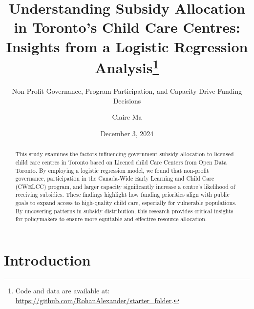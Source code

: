 \documentclass[
  letterpaper,
  DIV=11,
  numbers=noendperiod]{scrartcl}
\title{Understanding Subsidy Allocation in Toronto's Child Care Centres:
Insights from a Logistic Regression Analysis\thanks{Code and data are
available at: \url{https://github.com/RohanAlexander/starter_folder}.}}
\subtitle{Non-Profit Governance, Program Participation, and Capacity
Drive Funding Decisions}
\author{Claire Ma}
\date{December 3, 2024}
\begin{document}
\maketitle
\begin{abstract}
This study examines the factors influencing government subsidy
allocation to licensed child care centres in Toronto based on Licened
child Care Centers from Open Data Toronto. By employing a logistic
regression model, we found that non-profit governance, participation in
the Canada-Wide Early Learning and Child Care (CWELCC) program, and
larger capacity significantly increase a centre's likelihood of
receiving subsidies. These findings highlight how funding priorities
align with public goals to expand access to high-quality child care,
especially for vulnerable populations. By uncovering patterns in subsidy
distribution, this research provides critical insights for policymakers
to ensure more equitable and effective resource allocation.
\end{abstract}


\section{Introduction}\label{introduction}
\end{document}
